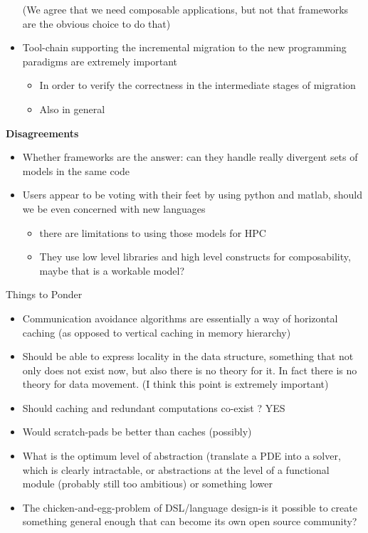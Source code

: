 \begin{itemize}
    (We agree that we need composable applications, but not that frameworks are the obvious choice to do that)
  \item Tool-chain supporting the incremental migration to the new programming paradigms are extremely important 
    \begin{itemize}
      \item In order to verify the correctness in the intermediate stages of migration  
      \item Also in general
    \end{itemize}
\end{itemize}


\noindent
\textbf{Disagreements}
\begin{itemize}
  \item Whether frameworks are the answer: can they handle really divergent sets of models in the same code
  \item Users appear to be voting with their feet by using python and matlab, should we be even concerned with new languages
    \begin{itemize}
      \item there are limitations to using those models for HPC
      \item They use low level libraries and high level constructs for composability, maybe that is a workable model?
    \end{itemize}
\end{itemize}

\noindent
Things to Ponder
\begin{itemize}
  \item Communication avoidance algorithms are essentially a way of horizontal caching (as opposed to vertical caching in memory
  hierarchy)
  \item Should be able to express locality in the data structure, something that not only does not exist now, but also there is no theory for
  it.
    In fact there is no theory for data movement. (I think this point is extremely important)
  \item Should caching and redundant computations co-exist ? YES
  \item Would scratch-pads be better than caches (possibly)
  \item What is the optimum level of abstraction (translate a PDE into a solver, which is clearly intractable, or abstractions at the level
   of a functional module (probably still too ambitious) or something lower
  \item The chicken-and-egg-problem of DSL/language design-is it possible to create something general enough that can become its own open source
   community?
\end{itemize}

